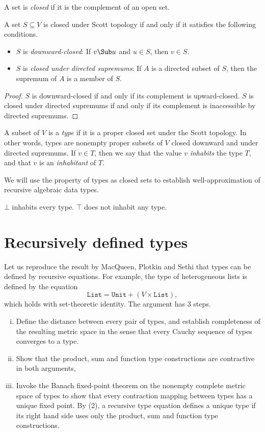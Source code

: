 A set is \emph{closed} if it is the complement of an open set.

\begin{lemma}
A set $S\subseteq V$ is closed under Scott topology if and
only if it satisfies the following conditions.
\begin{itemize}
\item $S$ is \emph{downward-closed}: If $v\Sub u$ and $u\in S$,
then $v\in S$.
\item $S$ is \emph{closed under directed supremums}: If
$A$ is a directed subset of $S$, then the supremum of $A$ is a
member of $S$.
\end{itemize}
\end{lemma}

\begin{proof}
$S$ is downward-closed if and only if its complement is
upward-closed. $S$ is closed under directed supremums if and only
if its complement is inaccessible by directed supremums.
\end{proof}


A subset of $V$ is a \emph{type} if it is a proper closed set
under the Scott topology. In other words, types are nonempty
proper subsets of $V$ closed downward and under directed
supremums. If $v\in T$, then we say that the value $v$
\emph{inhabits} the type $T$, and that $v$ is an
\emph{inhabitant} of $T$.

We will use the property of types as closed sets to establish
well-approximation of recursive algebraic data types.

\begin{lemma}
$\bot$ inhabits every type. $\top$ does not inhabit any type.
\end{lemma}

\section{Recursively defined types}


Let us reproduce the result by MacQueen, Plotkin and Sethi that
types can be defined by recursive equations. For example, the
type of heterogeneous lists is defined by the equation
\[
\texttt{List} = \texttt{Unit} + (V \times \texttt{List}),
\]
which holds with set-theoretic identity. The argument has 3
steps.
\begin{enumerate}[(i)]
\item Define the distance between every pair of types, and
establish completeness of the resulting metric space in the sense
that every Cauchy sequence of types converges to a type.
\item Show that the product, sum and function type constructions
are contractive in both arguments,
\item Invoke the Banach fixed-point theorem on the nonempty
complete metric space of types to show that every contraction
mapping between types has a unique fixed point. By (2), a
recursive type equation defines a unique type if its right hand
side uses only the product, sum and function type constructions.
\end{enumerate}

